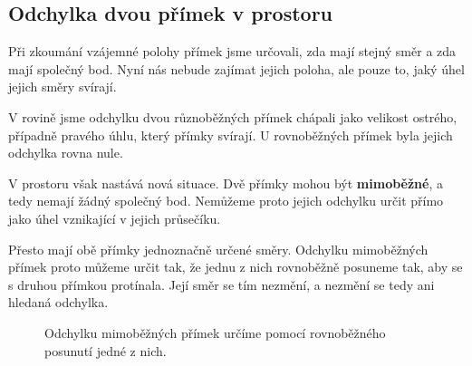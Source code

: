 \subsection{Odchylka dvou přímek v prostoru}
\label{subsec:Angle_between_lines_space}

Při zkoumání vzájemné polohy přímek jsme určovali, zda mají stejný
směr a zda mají společný bod. Nyní nás nebude zajímat jejich poloha,
ale pouze to, jaký úhel jejich směry svírají.

V rovině jsme odchylku dvou různoběžných přímek chápali jako velikost
ostrého, případně pravého úhlu, který přímky svírají. U rovnoběžných
přímek byla jejich odchylka rovna nule.

V prostoru však nastává nová situace. Dvě přímky mohou být
\textbf{mimoběžné}, a tedy nemají žádný společný bod. Nemůžeme proto
jejich odchylku určit přímo jako úhel vznikající v jejich průsečíku.

Přesto mají obě přímky jednoznačně určené směry. Odchylku mimoběžných
přímek proto můžeme určit tak, že jednu z nich rovnoběžně posuneme tak,
aby se s druhou přímkou protínala. Její směr se tím nezmění, a nezmění
se tedy ani hledaná odchylka.

\begin{figure}[H]
    \centering
    \caption{Odchylku mimoběžných přímek určíme pomocí rovnoběžného
    posunutí jedné z nich.}
    \label{fig:Angle_skew_lines_space}
\end{figure}

